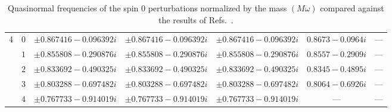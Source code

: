 \begin{table}[ht]
{\begin{tabular}{l |c|c|c|c|c|c}
      4   & $0$ & $\pm 0.867416 -0.096392 i$                & $\pm 0.867416 -0.096392 i$                 & $\pm 0.867416 -0.096392 i$ & $0.8673-0.0964 i$      & ---                         \\
          & $1$ & $\pm 0.855808 -0.290876 i$                & $\pm 0.855808 -0.290876 i$                 & $\pm 0.855808 -0.290876 i$ & $0.8557-0.2909 i$      & ---                         \\
          & $2$ & $\pm 0.833692 -0.490325 i$                & $\pm 0.833692 -0.490325 i$                 & $\pm 0.833692 -0.490325 i$ & $0.8345-0.4895 i$      & ---                         \\
          & $3$ & $\pm 0.803288 -0.697482 i$                & $\pm 0.803288 -0.697482 i$                 & $\pm 0.803288 -0.697482 i$ & $0.8064-0.6926 i$      & ---                         \\
          & $4$ & $\pm 0.767733 -0.914019 i$                & $\pm 0.767733 -0.914019 i$                 & $\pm 0.767733 -0.914019 i$ & ---                    & ---                         \\
      \hline\hline
    \end{tabular}
  }
  \caption{
    Quasinormal frequencies of the spin $0$ perturbations normalized by the mass $(M\omega)$ compared against the results of Refs.~\cite{Shu:2005fw, Konoplya:2004ip}.
  }
  \label{Tab:Spin0}
\end{table}

